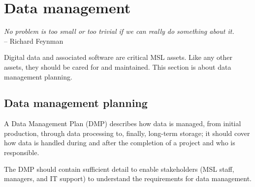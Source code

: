\section{Data management}
\begin{flushright}
\textit{No problem is too small or too trivial if we can really do something about it.} \\
-- Richard Feynman 
\end{flushright}


Digital data and associated software are critical MSL assets. Like any other assets, they should be cared for and maintained. This section is about data management planning. 

\subsection{Data management planning}
A Data Management Plan (DMP) describes how data is managed, from initial production, through data processing to, finally, long-term storage; it should cover how data is handled during and after the completion of a project and who is responsible.

The DMP should contain sufficient detail to enable stakeholders (MSL staff, managers, and IT support) to understand the requirements for data management.

